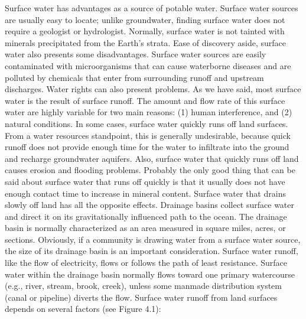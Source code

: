 \documentclass{article}
\begin{document}
Surface water has advantages as a source of potable water. Surface water
sources are usually easy to locate; unlike groundwater, finding surface
water does not require a geologist or hydrologist. Normally, surface
water is not tainted with minerals precipitated from the Earth's strata.
Ease of discovery aside, surface water also presents some disadvantages.
Surface water sources are easily contaminated with microorganisms that
can cause waterborne diseases and are polluted by chemicals that enter
from surrounding runoff and upstream discharges. Water rights can also
present problems. As we have said, most surface water is the result of
surface runoff. The amount and flow rate of this surface water are
highly variable for two main reasons: (1) human interference, and (2)
natural conditions. In some cases, surface water quickly runs off land
surfaces. From a water resources standpoint, this is generally
undesirable, because quick runoff does not provide enough time for the
water to infiltrate into the ground and recharge groundwater aquifers.
Also, surface water that quickly runs off land causes erosion and
flooding problems. Probably the only good thing that can be said about
surface water that runs off quickly is that it usually does not have
enough contact time to increase in mineral content. Surface water that
drains slowly off land has all the opposite effects. Drainage basins
collect surface water and direct it on its gravitationally influenced
path to the ocean. The drainage basin is normally characterized as an
area measured in square miles, acres, or sections. Obviously, if a
community is drawing water from a surface water source, the size of its
drainage basin is an important consideration. Surface water runoff, like
the flow of electricity, flows or follows the path of least resistance.
Surface water within the drainage basin normally flows toward one
primary watercourse (e.g., river, stream, brook, creek), unless some
manmade distribution system (canal or pipeline) diverts the flow.
Surface water runoff from land surfaces depends on several factors (see
Figure 4.1):
\end{document}
